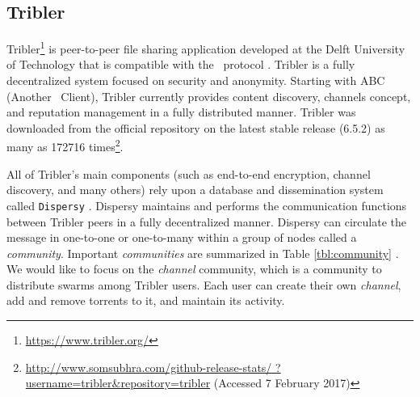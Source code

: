 \subsection{Tribler}
\label{section:tribler}
Tribler\footnote{\url{https://www.tribler.org/}} is peer-to-peer file sharing application developed at the Delft University of Technology that is compatible with the \bt~protocol \cite{2008:tribler:pouwelse}. Tribler is a fully decentralized system focused on security and anonymity. Starting with ABC (Another \bt~Client), Tribler currently provides content discovery, channels concept, and reputation management in a fully distributed manner. Tribler was downloaded from the official repository on the latest stable release (6.5.2) as many as 172716 times\footnote{\url{http://www.somsubhra.com/github-release-stats/ ?username=tribler&repository=tribler} (Accessed 7 February 2017)}.

All of Tribler's main components (such as end-to-end encryption, channel discovery, and many others) rely upon a database and dissemination system called \texttt{Dispersy} \cite{2013:dispersy:zeilemaker}. Dispersy maintains and performs the communication functions between Tribler peers in a fully decentralized manner. Dispersy can circulate the message in one-to-one or one-to-many within a group of nodes called a \textit{community}. Important \textit{communities} are summarized in Table \ref{tbl:community} \cite{2016:tribler-techdebt:vos}. We would like to focus on the \textit{channel} community, which is a community to distribute swarms among Tribler users. Each user can create their own \textit{channel}, add and remove torrents to it, and maintain its activity. 


